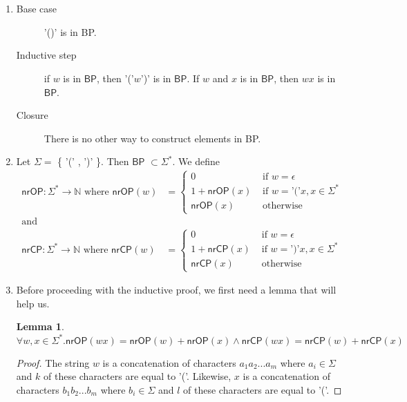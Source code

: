 \documentclass{article}
\newtheorem{lemma}[theorem]{Lemma}
\begin{document}
\section{}
\begin{enumerate}
    \item 
        \begin{description}
            \item[Base case] '()' is in BP. 
            \item[Inductive step] if $w$ is in $\mathsf{BP}$, then '('$w$')' is in $\mathsf{BP}$. If $w$ and $x$ is in $\mathsf{BP}$, then $wx$ is in $\mathsf{BP}$.
            \item[Closure] There is no other way to construct elements in BP.
        \end{description}

    \item
        Let $\Sigma =$ \{ '(' , ')' \}. Then $\mathsf{BP}$ $\subset \Sigma^*$.
        We define
        \begin{align*}
            \mathsf{nrOP} : \Sigma^* \to \mathbb{N} \text{ where } \mathsf{nrOP}(w) &=
            \begin{cases}
                0 &\text{ if } w = \epsilon\\
                1 + \mathsf{nrOP}(x) &\text{ if } w = \text{'('}x, x \in \Sigma^*\\
                \mathsf{nrOP}(x) &\text{ otherwise }
            \end{cases}
            \\
            \text{and}\\
            \mathsf{nrCP} : \Sigma^* \to \mathbb{N} \text{ where } \mathsf{nrCP} (w) &=
            \begin{cases} 
                0 &\text{ if } w = \epsilon\\
            1 + \mathsf{nrCP} (x) &\text{ if } w = \text{')'}x, x \in \Sigma^*\\
                \mathsf{nrCP} (x) &\text{ otherwise }
            \end{cases}
        \end{align*}

    \item
        Before proceeding with the inductive proof, we first need a lemma that will help us.
        \begin{lemma}\label{lemma:2}
            $\forall w,x \in \Sigma^* . \mathsf{nrOP}(wx) = \mathsf{nrOP}(w) + \mathsf{nrOP}(x) \land \mathsf{nrCP}(wx) = \mathsf{nrCP}(w) + \mathsf{nrCP}(x)$
        \end{lemma}
        \begin{proof} The string $w$ is a concatenation of characters $a_1a_2...a_m$ where $a_i \in \Sigma$ and $k$ of these characters are equal to '('. Likewise, $x$ is a concatenation of characters $b_1b_2...b_m$ where $b_i \in \Sigma$ and $l$ of these characters are equal to '('.


\end{proof}
\end{enumerate}
\end{document}
